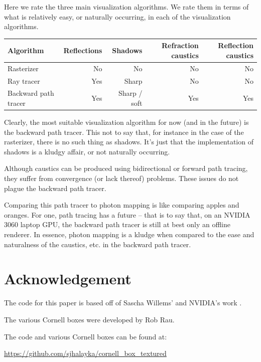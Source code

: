\documentclass[12pt]{article}
\begin{document}
Here we rate the three main visualization algorithms.
We rate them in terms of what is relatively easy, or naturally occurring, in each of the visualization algorithms.
\begin{center}
\begin{tabular}{| l | r | r | r | r |}
  \hline
 Algorithm &  Reflections & Shadows & Refraction caustics & Reflection caustics \\
\hline
\hline
Rasterizer & No & No & No &  No \\
Ray tracer & Yes & Sharp & No & No  \\
Backward path tracer & Yes & Sharp / soft & Yes & Yes \\
  \hline  
\end{tabular}
\end{center}
Clearly, the most suitable visualization algorithm for now (and in the future) is the backward path tracer.
This not to say that, for instance in the case of the rasterizer, there is no such thing as shadows.
It's just that the implementation of shadows is a kludgy affair, or not naturally occurring.

Although caustics can be produced using bidirectional or forward path tracing, they suffer from convergence (or lack thereof) problems.
These issues do not plague the backward path tracer.

Comparing this path tracer to photon mapping \cite{john} is like comparing apples and oranges.
For one, path tracing has a future -- that is to say that, on an NVIDIA 3060 laptop GPU, the backward path tracer is still at best only an offline renderer.
In essence, photon mapping is a kludge when compared to the ease and naturalness of the caustics, etc. in the backward path tracer.




\section{Acknowledgement}

The code for this paper is based off of Sascha Willems' and NVIDIA's work \cite{willems1, willems2, nvidia}.

The various Cornell boxes were developed by Rob Rau.

The code and various Cornell boxes can be found at: 

\url{https://github.com/sjhalayka/cornell_box_textured}
\end{document}
